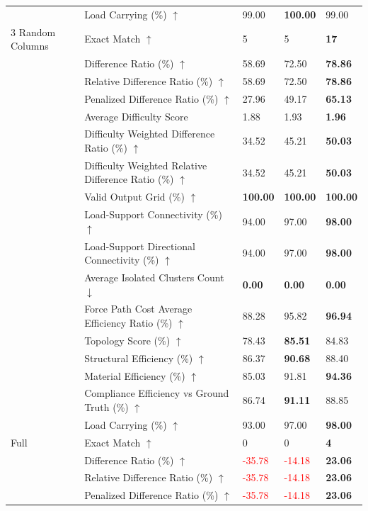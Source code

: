 \begin{table}[!h]
{\begin{tabular}{lllll}
 & Load Carrying (\%) $\uparrow$ & 99.00 & \textbf{100.00} & 99.00 \\
3 Random Columns & Exact Match $\uparrow$ & 5 & 5 & \textbf{17} \\
 & Difference Ratio (\%) $\uparrow$ & 58.69 & 72.50 & \textbf{78.86} \\
 & Relative Difference Ratio (\%) $\uparrow$ & 58.69 & 72.50 & \textbf{78.86} \\
 & Penalized Difference Ratio (\%) $\uparrow$ & 27.96 & 49.17 & \textbf{65.13} \\
 & Average Difficulty Score & 1.88 & 1.93 & \textbf{1.96} \\
 & Difficulty Weighted Difference Ratio (\%) $\uparrow$ & 34.52 & 45.21 & \textbf{50.03} \\
 & Difficulty Weighted Relative Difference Ratio (\%) $\uparrow$ & 34.52 & 45.21 & \textbf{50.03} \\
 & Valid Output Grid (\%) $\uparrow$ & \textbf{100.00} & \textbf{100.00} & \textbf{100.00} \\
 & Load-Support Connectivity (\%) $\uparrow$ & 94.00 & 97.00 & \textbf{98.00} \\
 & Load-Support Directional Connectivity (\%) $\uparrow$ & 94.00 & 97.00 & \textbf{98.00} \\
 & Average Isolated Clusters Count $\downarrow$ & \textbf{0.00} & \textbf{0.00} & \textbf{0.00} \\
 & Force Path Cost Average Efficiency Ratio (\%) $\uparrow$ & 88.28 & 95.82 & \textbf{96.94} \\
 & Topology Score (\%) $\uparrow$ & 78.43 & \textbf{85.51} & 84.83 \\
 & Structural Efficiency (\%) $\uparrow$ & 86.37 & \textbf{90.68} & 88.40 \\
 & Material Efficiency (\%) $\uparrow$ & 85.03 & 91.81 & \textbf{94.36} \\
 & Compliance Efficiency vs Ground Truth (\%) $\uparrow$ & 86.74 & \textbf{91.11} & 88.85 \\
 & Load Carrying (\%) $\uparrow$ & 93.00 & 97.00 & \textbf{98.00} \\
Full & Exact Match $\uparrow$ & 0 & 0 & \textbf{4} \\
 & Difference Ratio (\%) $\uparrow$ & \textcolor{red}{-35.78} & \textcolor{red}{-14.18} & \textbf{23.06} \\
 & Relative Difference Ratio (\%) $\uparrow$ & \textcolor{red}{-35.78} & \textcolor{red}{-14.18} & \textbf{23.06} \\
 & Penalized Difference Ratio (\%) $\uparrow$ & \textcolor{red}{-35.78} & \textcolor{red}{-14.18} & \textbf{23.06} \\

\end{tabular}}
\end{table}
